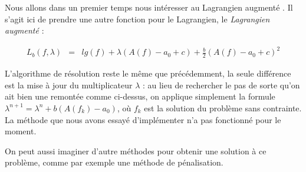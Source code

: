 \documentclass[10pt,a4paper]{article}
\theoremstyle{plain}
\theoremstyle{definition}
\begin{document}
Nous allons dans un premier temps nous intéresser au Lagrangien augmenté \cite{cohen00}. Il s'agit ici de prendre une autre fonction pour le Lagrangien, le \emph{Lagrangien augmenté} :

\begin{eqnarray*}
L_b(f,\lambda)&=& lg(f) + \lambda\left(A(f)-a_0 + c\right) + \frac{b}{2}\left(A(f)-a_0+c\right)^2
\end{eqnarray*}

L'algorithme de résolution reste le même que précédemment, la seule différence est la mise à jour du multiplicateur $\lambda$ : au lieu de rechercher le pas de sorte qu'on ait bien une remontée comme ci-dessus, on applique simplement la formule $\lambda^{n+1} = \lambda^n+b(A(f_k)-a_0)$, où $f_k$ est la solution du problème sans contrainte. La méthode que nous avons essayé d'implémenter n'a pas fonctionné pour le moment.

On peut aussi imaginer d'autre méthodes pour obtenir une solution à ce problème, comme par exemple une méthode de pénalisation.




\end{document}
